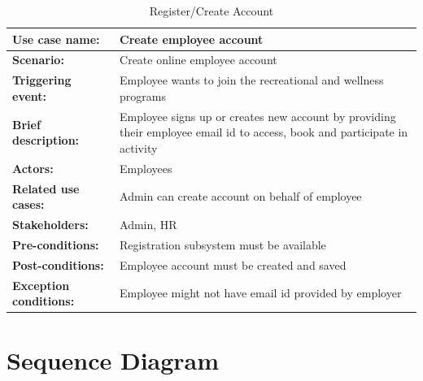 \begin{table}[h!t]
    \caption{Register/Create Account}
    \begin{center}
    \small %
    \begin{tabularx}{\textwidth}{|l|X|}
    \hline
    \rule{0pt}{24pt}  \textbf{Use case name:} & Create employee account \\
    \hline
    \rule{0pt}{24pt}  \textbf{Scenario:} & Create online employee account \\
    \hline
    \rule{0pt}{24pt}  \textbf{Triggering event:} & Employee wants to join the recreational and wellness programs \\
    \hline
    \rule{0pt}{24pt}  \textbf{Brief description:} & Employee signs up or creates new account by providing their employee email id to access, book and participate in activity \\
    \hline
    \rule{0pt}{24pt}  \textbf{Actors:} & Employees \\
    \hline
    \rule{0pt}{24pt}  \textbf{Related use cases:} & Admin can create account on behalf of employee \\
    \hline
    \rule{0pt}{24pt}  \textbf{Stakeholders:} & Admin, HR \\
    \hline
    \rule{0pt}{24pt}  \textbf{Pre-conditions:} & Registration subsystem must be available \\
    \hline
    \rule{0pt}{24pt}  \textbf{Post-conditions:} & Employee account must be created and saved \\
    \hline
    \rule{0pt}{24pt}  \textbf{Exception conditions:} & Employee might not have email id provided by employer \\
    \hline
    \end{tabularx}
    \end{center}
    \label{tab:createAccount}
    \end{table}
\FloatBarrier

\section{Sequence Diagram}


